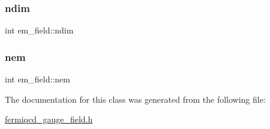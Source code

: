 \mbox{\label{classem__field_ad35fcd68bba9a301d34ceabc76f08226}} 
\subsubsection{\texorpdfstring{ndim}{ndim}}
{\footnotesize\ttfamily int em\+\_\+field\+::ndim}

\mbox{\label{classem__field_ab0049c2b2edc267a93c9299aecede037}} 
\subsubsection{\texorpdfstring{nem}{nem}}
{\footnotesize\ttfamily int em\+\_\+field\+::nem}



The documentation for this class was generated from the following file\+:\begin{DoxyCompactItemize}
\item 
\hyperlink{fermiqcd__gauge__field_8h}{fermiqcd\+\_\+gauge\+\_\+field.\+h}\end{DoxyCompactItemize}
